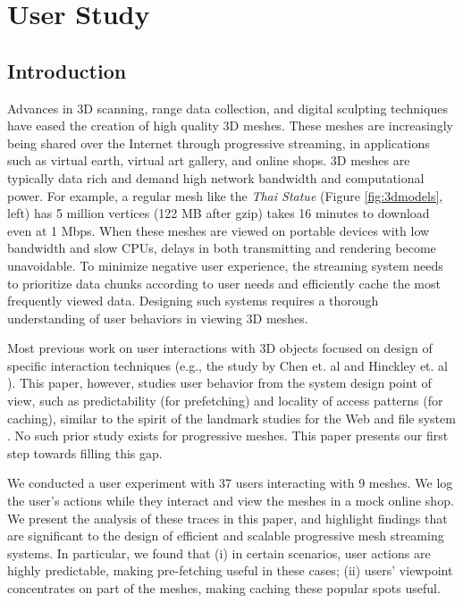 \chapter{User Study}
\label{c:user}
\section{Introduction}

Advances in 3D scanning, range data collection, and digital sculpting techniques have 
eased the creation of high quality 3D meshes.
These meshes are increasingly being shared over the Internet through progressive streaming, in applications such as virtual earth, virtual art gallery, and online shops.  
3D meshes are typically data rich and demand high network bandwidth and
computational power. For example, a regular mesh like the \textit{Thai Statue} (Figure \ref{fig:3dmodels}, left) has 5 million vertices (122 MB after gzip) takes 16 minutes to download even at 1 Mbps.  When these meshes are 
viewed on portable devices with
low bandwidth and slow CPUs, delays in both transmitting and
rendering become unavoidable. To minimize negative user experience, the
streaming system needs to prioritize data chunks according to user needs and
efficiently cache the most frequently viewed data.  Designing such
systems requires a thorough understanding of user behaviors in viewing 3D
meshes.

Most previous work on user interactions with 3D objects
focused on design of specific interaction
techniques
(e.g., the study by Chen et. al \cite{chen88study} and Hinckley et. al \cite{hinckley97usability}). 
This paper, however, studies
user behavior from the system design point of view, 
such as predictability (for prefetching) and locality of access patterns (for caching),
similar to the spirit of the landmark studies for the Web \cite{huberman98web} and file system \cite{ousterhout85trace}.  No such prior study exists for progressive meshes.  This paper presents our first step towards filling 
this gap.

We conducted 
a user experiment with 37 users interacting with 9 meshes.
We log the user's actions while they interact and view the meshes in a mock online shop.  We present the analysis of these traces in this paper, and highlight findings that are significant to the design of efficient and scalable progressive mesh streaming systems.  In particular, we found that (i) in certain scenarios, user actions are highly predictable, making pre-fetching useful in these cases; (ii) users' viewpoint concentrates on part of the meshes, making caching these popular spots useful. %

